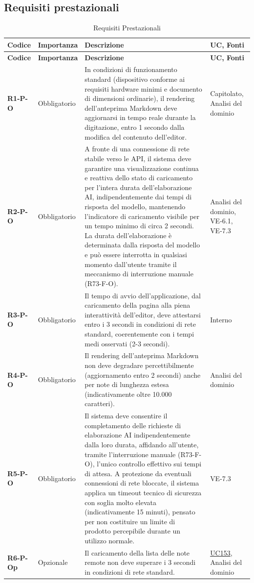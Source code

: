 \subsection{Requisiti prestazionali}
\begin{longtable}{|p{2.5cm}|p{2.2cm}|p{6.8cm}|p{2.7cm}|}
	\caption{Requisiti Prestazionali} \\
	\hline
	\rowcolor{primarycolor!10}
	\textbf{Codice} & \textbf{Importanza} & \textbf{Descrizione} & \textbf{UC, Fonti} \\
	\hline
	\endfirsthead
	\hline
	\rowcolor{primarycolor!10}
	\textbf{Codice} & \textbf{Importanza} & \textbf{Descrizione} & \textbf{UC, Fonti} \\
	\hline
	\endhead

	\textbf{R1-P-O} & Obbligatorio & In condizioni di funzionamento standard (dispositivo conforme ai requisiti hardware minimi e documento di dimensioni ordinarie), il rendering dell'anteprima Markdown deve aggiornarsi in tempo reale durante la digitazione, entro 1 secondo dalla modifica del contenuto dell'editor. & Capitolato, Analisi del dominio \\ \hline
	\textbf{R2-P-O} & Obbligatorio & A fronte di una connessione di rete stabile verso le API, il sistema deve garantire una visualizzazione continua e reattiva dello stato di caricamento per l'intera durata dell'elaborazione AI, indipendentemente dai tempi di risposta del modello, mantenendo l'indicatore di caricamento visibile per un tempo minimo di circa 2 secondi. La durata dell'elaborazione è determinata dalla risposta del modello e può essere interrotta in qualsiasi momento dall'utente tramite il meccanismo di interruzione manuale (R73-F-O). & Analisi del dominio, VE-6.1, VE-7.3 \\ \hline
\textbf{R3-P-O} & Obbligatorio & Il tempo di avvio dell'applicazione, dal caricamento della pagina alla piena interattività dell'editor, deve attestarsi entro i 3 secondi in condizioni di rete standard, coerentemente con i tempi medi osservati (2-3 secondi). & Interno \\ \hline
	\textbf{R4-P-O} & Obbligatorio & Il rendering dell'anteprima Markdown non deve degradare percettibilmente (aggiornamento entro 2 secondi) anche per note di lunghezza estesa (indicativamente oltre 10.000 caratteri). & Analisi del dominio \\ \hline
	\textbf{R5-P-O} & Obbligatorio & Il sistema deve consentire il completamento delle richieste di elaborazione AI indipendentemente dalla loro durata, affidando all'utente, tramite l'interruzione manuale (R73-F-O), l'unico controllo effettivo sui tempi di attesa. A protezione da eventuali connessioni di rete bloccate, il sistema applica un timeout tecnico di sicurezza con soglia molto elevata (indicativamente 15 minuti), pensato per non costituire un limite di prodotto percepibile durante un utilizzo normale. & VE-7.3 \\ \hline
	\textbf{R6-P-Op} & Opzionale & Il caricamento della lista delle note remote non deve superare i 3 secondi in condizioni di rete standard. & \hyperlink{uc153}{UC153}, Analisi del dominio \\ \hline
\end{longtable}